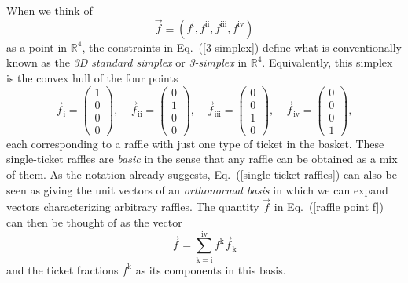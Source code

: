 When we think of 
\begin{equation}
\vec{f}\equiv (f^{\mathrm{i}},f^{\mathrm{ii}},f^{\mathrm{iii}},f^{\mathrm{iv}})
\label{raffle point f}
\end{equation}
as a point in $\mathbb{R}^{4}$, the constraints in Eq.\ (\ref{3-simplex}) define what is conventionally known as the \emph{3D standard simplex} or \emph{3-simplex} in $\mathbb{R}^{4}$.  Equivalently, this simplex is the convex hull of the four points 
\begin{equation}
\vec{f}_{\mathrm{i}}= 
\begin{pmatrix}
1 \\
0 \\
0 \\
0
\end{pmatrix}, \quad 
\vec{f}_{\mathrm{ii}} = \begin{pmatrix}
0 \\
1 \\
0 \\
0
\end{pmatrix}, \quad
\vec{f}_{\mathrm{iii}} = \begin{pmatrix}
0 \\
0 \\
1 \\
0
\end{pmatrix}, \quad 
\vec{f}_{\mathrm{iv}} = \begin{pmatrix}
0 \\
0 \\
0 \\
1
\end{pmatrix},
\label{single ticket raffles}
\end{equation}
each corresponding to a raffle with just one type of ticket in the basket. These single-ticket raffles are \emph{basic} in the sense that any raffle can be obtained as a mix of them. As the notation already suggests, Eq.\ (\ref{single ticket raffles}) can also be seen as giving the unit vectors of an \emph{orthonormal basis} in which we can expand vectors characterizing arbitrary raffles. The quantity $\vec{f}$ in Eq.\ (\ref{raffle point f}) can then be thought of as the vector
\begin{equation}
\vec{f} =  \sum_{\mathrm{k=i}}^{\mathrm{iv}} f^{\mathrm{k}} \vec{f}_{\mathrm{k}}
\label{expansion of vec f} 
\end{equation}
and the ticket fractions $f^{\mathrm k}$ as its components in this basis.

